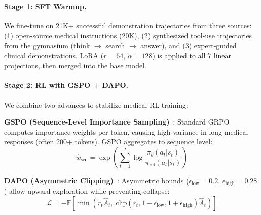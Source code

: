 \documentclass{article}
\begin{document}
\paragraph{Stage 1: SFT Warmup.}
We fine-tune on 21K+ successful demonstration trajectories from three sources: (1) open-source medical instructions (20K), (2) synthesized tool-use trajectories from the gymnasium (think $\to$ search $\to$ answer), and (3) expert-guided clinical demonstrations. LoRA ($r{=}64$, $\alpha{=}128$) is applied to all 7 linear projections, then merged into the base model.

\paragraph{Stage 2: RL with GSPO + DAPO.}
We combine two advances to stabilize medical RL training:

\textbf{GSPO (Sequence-Level Importance Sampling)}~\citep{gspo2025}: Standard GRPO computes importance weights per token, causing high variance in long medical responses (often 200+ tokens). GSPO aggregates to sequence level:
\begin{equation}
    \hat{w}_{\text{seq}} = \exp\!\left(\sum_{t=1}^{T} \log \frac{\pi_\theta(a_t | s_t)}{\pi_{\text{ref}}(a_t | s_t)}\right)
\end{equation}

\textbf{DAPO (Asymmetric Clipping)}~\citep{dapo2025}: Asymmetric bounds ($\epsilon_{\text{low}}{=}0.2$, $\epsilon_{\text{high}}{=}0.28$) allow upward exploration while preventing collapse:
\begin{equation}
    \mathcal{L} = -\mathbb{E}\!\left[\min\!\left(r_t \hat{A}_t,\; \text{clip}(r_t, 1{-}\epsilon_{\text{low}}, 1{+}\epsilon_{\text{high}}) \hat{A}_t\right)\right]
\end{equation}
\end{document}

